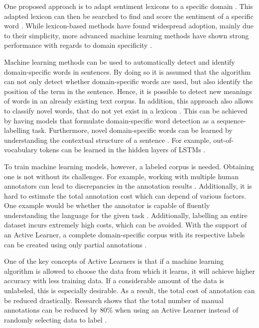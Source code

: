 \documentclass[11pt, a4paper]{article}
\begin{document}
One proposed approach is to adapt sentiment lexicons to a specific domain \citep{Lu2011automaticconstruction}. This adapted lexicon can then be searched to find and score the sentiment 
of a specific word \citep{ashgar2014DetectionSlang}. 
While lexicon-based methods have found widespread adoption, mainly due to their simplicity, more advanced machine 
learning methods have shown strong performance with regards to domain specificity \citep{wang2020automaticconstructiondomainsentiment}. %

Machine learning methods can be used to automatically detect and identify domain-specific words in sentences. By doing so it is assumed that the 
algorithm can not only detect whether domain-specific words are used, but also identify 
the position of the term in the sentence. Hence, it is possible to detect new meanings 
of words in an already existing text corpus. In addition, this approach also allows to classify novel words, that do not yet 
exist in a lexicon \citep{pei2019slang}. This can be achieved by having models that formulate domain-specific word detection as a 
sequence-labelling task. Furthermore, novel domain-specific words can be learned by understanding the contextual 
structure of a sentence \citep{pei2019slang}. For example, out-of-vocabulary tokens can be learned in the hidden layers of 
LSTMs \citep{hochreiter1997lstm}.

To train machine learning models, however, a labeled corpus is needed. Obtaining one is not without its challenges.
For example, working with multiple human annotators can lead to discrepancies in the annotation results \citep{kim2008corpusannotation, rayan2019sentimentanalysisemail}. 
Additionally, it is hard to estimate the total annotation cost which can depend of various factors. One example would be whether the annotator is capable of fluently understanding 
the language for the given task \citep{arora2009estimationgannotationcost}. Additionally, labelling an entire dataset incurs extremely high costs, 
which can be avoided. With the support of an Active Learner, a complete domain-specific corpus with its respective labels can be 
created using only partial annotations \citep{park2015EfficientExtraction}. 

One of the key concepts of Active Learners is that if a machine learning algorithm is allowed to choose the data from which it learns, 
it will achieve higher accuracy with less training data. If a considerable amount of the data is unlabeled, this is especially desirable. 
As a result, the total cost of annotation can be reduced drastically. Research shows that the total number of 
manual annotations can be reduced by 80\% when using an Active Learner instead of randomly 
selecting data to label \citep{baldridgeosborne2004active}.
\end{document}
